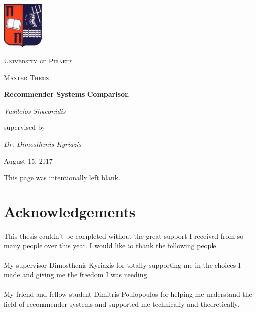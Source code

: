 \documentclass{article}
\begin{document}
	\begin{titlepage}
		\centering
		\includegraphics[width=0.15\textwidth]{images/UniversityOfPiraeusLogo.png}\par\vspace{1cm}
		{\scshape\LARGE University of Piraeus \par}
		\vspace{1cm}
		{\scshape\Large Master Thesis\par}
		\vspace{1.5cm}
		{\huge\bfseries Recommender Systems Comparison\par}
		\vspace{2cm}
		{\Large\itshape Vasileios Simeonidis\par}
		\vspace{7cm}
		supervised by\par
		\textit{Dr. Dimosthenis Kyriazis}
		\vfill
		{\large August 15, 2017\par}
	\end{titlepage}


\newpage
\tableofcontents
{}
\newpage
{}
\begin{center}
This page was intentionally left blank.
\end{center}
\newpage
\section*{Acknowledgements}

\paragraph{} This thesis couldn't be completed without the great support I received from so many people over this year. I would like to thank the following people.

\paragraph{} My supervisor Dimosthenis Kyriazis for totally supporting me in the choices I made and giving me the freedom I was needing.

\paragraph{} My friend and fellow student Dimitris Poulopoulos for helping me understand the field of recommender systems and supported me technically and theoretically.
\end{document}
